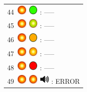 \documentclass[12pt, a4paper]{report}
\begin{document}
\begin{minipage}{0.45\textwidth}
\begin{Large}
\begin{tabular}{l}
		44\  \includegraphics*[width=5mm]{red_led_flashing} \includegraphics*[width=5mm]{green_led} : -----\\
		
		45\  \includegraphics*[width=5mm]{red_led_flashing} \includegraphics*[width=5mm]{green_led_flashing} : -----\\
	
		46\  \includegraphics*[width=5mm]{red_led_flashing} \includegraphics*[width=5mm]{orange_led} : -----\\
		
		47\  \includegraphics*[width=5mm]{red_led_flashing} \includegraphics*[width=5mm]{orange_led_flashing} : -----\\
		
		48\  \includegraphics*[width=5mm]{red_led_flashing} \includegraphics*[width=5mm]{red_led} : -----\\
		
		49\  \includegraphics*[width=5mm]{red_led_flashing} \includegraphics*[width=5mm]{red_led_flashing} \includegraphics*[width=5mm]{speaker} : ERROR\\
	\end{tabular}
	\end{Large}
	\end{minipage}%
\end{document}
